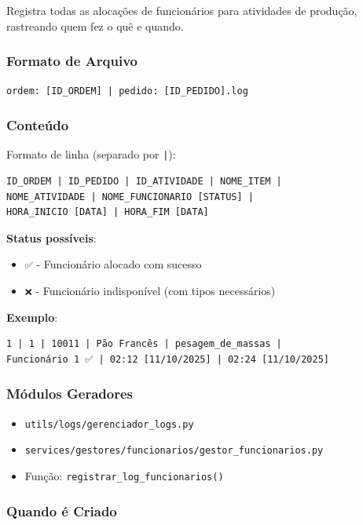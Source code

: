 \documentclass[11pt,a4paper]{article}
\begin{document}
Registra todas as alocações de funcionários para atividades de produção, rastreando quem fez o quê e quando.

\subsubsection{Formato de Arquivo}

\texttt{ordem: [ID\_ORDEM] | pedido: [ID\_PEDIDO].log}

\subsubsection{Conteúdo}

Formato de linha (separado por \texttt{|}):
\begin{verbatim}
ID_ORDEM | ID_PEDIDO | ID_ATIVIDADE | NOME_ITEM |
NOME_ATIVIDADE | NOME_FUNCIONARIO [STATUS] |
HORA_INICIO [DATA] | HORA_FIM [DATA]
\end{verbatim}

\textbf{Status possíveis}:
\begin{itemize}
    \item \texttt{✅} - Funcionário alocado com sucesso
    \item \texttt{❌} - Funcionário indisponível (com tipos necessários)
\end{itemize}

\textbf{Exemplo}:
\begin{verbatim}
1 | 1 | 10011 | Pão Francês | pesagem_de_massas |
Funcionário 1 ✅ | 02:12 [11/10/2025] | 02:24 [11/10/2025]
\end{verbatim}

\subsubsection{Módulos Geradores}

\begin{itemize}
    \item \texttt{utils/logs/gerenciador\_logs.py}
    \item \texttt{services/gestores/funcionarios/gestor\_funcionarios.py}
    \item Função: \texttt{registrar\_log\_funcionarios()}
\end{itemize}

\subsubsection{Quando é Criado}
\end{document}
